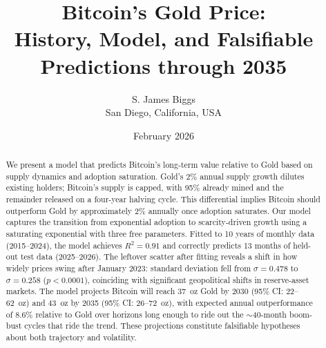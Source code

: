 \documentclass[11pt,letterpaper]{article}
\title{Bitcoin's Gold Price:\\History, Model, and Falsifiable Predictions through 2035}
\author{S. James Biggs\\
\small San Diego, California, USA}
\date{February 2026}
\begin{document}
\maketitle

\begin{abstract}
We present a model that predicts Bitcoin's long-term value relative to Gold based on supply dynamics and adoption saturation. Gold's 2\% annual supply growth dilutes existing holders; Bitcoin's supply is capped, with 95\% already mined and the remainder released on a four-year halving cycle. This differential implies Bitcoin should outperform Gold by approximately 2\% annually once adoption saturates. Our model captures the transition from exponential adoption to scarcity-driven growth using a saturating exponential with three free parameters. Fitted to 10 years of monthly data (2015--2024), the model achieves $R^2 = 0.91$ and correctly predicts 13 months of held-out test data (2025--2026). The leftover scatter after fitting reveals a shift in how widely prices swing after January 2023: standard deviation fell from $\sigma = 0.478$ to $\sigma = 0.258$ ($p < 0.0001$), coinciding with significant geopolitical shifts in reserve-asset markets. The model projects Bitcoin will reach 37~oz Gold by 2030 (95\% CI: 22--62~oz) and 43~oz by 2035 (95\% CI: 26--72~oz), with expected annual outperformance of 8.6\% relative to Gold over horizons long enough to ride out the $\sim$40-month boom-bust cycles that ride the trend. These projections constitute falsifiable hypotheses about both trajectory and volatility.
\end{abstract}

\end{document}
